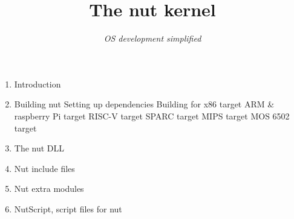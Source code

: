 \documentclass{article}
\title{The nut kernel}
\author{\textit{OS development simplified}}
\date{}
\begin{document}
  \maketitle
  \newpage

  \begin{enumerate}
  	\LARGE \item Introduction
  	\\
  	\LARGE \item Building nut
    \Large \subitem Setting up dependencies
  	\Large \subitem Building for x86 target
  	\Large \subitem ARM \& raspberry Pi target
  	\Large \subitem RISC-V target
  	\Large \subitem SPARC target
  	\Large \subitem MIPS target
  	\Large \subitem MOS 6502 target
  	\LARGE \item The nut DLL
  	\LARGE \item Nut include files
    \LARGE \item Nut extra modules
  	\LARGE \item NutScript, script files for nut
  \end{enumerate}
\end{document}
